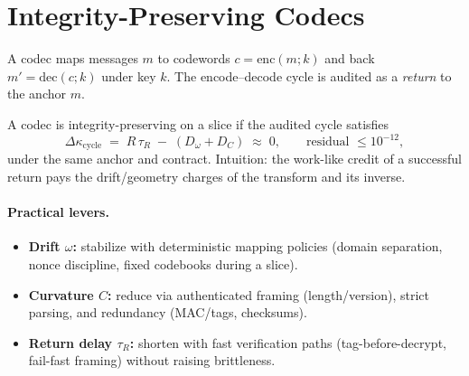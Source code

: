 

\section{Integrity-Preserving Codecs}
\label{sec:crypto-codecs}

A codec maps messages \(m\) to codewords \(c=\mathrm{enc}(m;k)\) and back \(m'=\mathrm{dec}(c;k)\) under key \(k\). The encode–decode cycle is audited as a \emph{return} to the anchor \(m\).

\begin{definition}
A codec is integrity-preserving on a slice if the audited cycle satisfies
\[
\Delta\kappa_{\text{cycle}} \;=\; R\,\tau_{R} \;-\; (D_{\omega}+D_{C}) \;\approx\; 0,
\qquad \text{residual }\le 10^{-12},
\]
under the same anchor and contract. Intuition: the work-like credit of a successful return pays the drift/geometry charges of the transform and its inverse.
\end{definition}

\paragraph{Practical levers.}
\begin{itemize}[leftmargin=1.25em]
  \item \textbf{Drift \(\omega\):} stabilize with deterministic mapping policies (domain separation, nonce discipline, fixed codebooks during a slice).
  \item \textbf{Curvature \(C\):} reduce via authenticated framing (length/version), strict parsing, and redundancy (MAC/tags, checksums).
  \item \textbf{Return delay \(\tau_R\):} shorten with fast verification paths (tag-before-decrypt, fail-fast framing) without raising brittleness.
\end{itemize}

